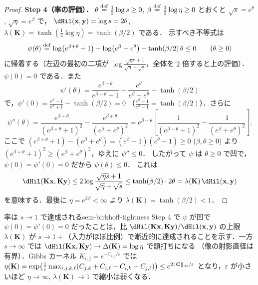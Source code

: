 \begin{proof}
  \textbf{Step 4（率の評価）．}
  $\theta \overset{\mathrm{def}}{=} \tfrac12\log s \geq 0$, $\beta \overset{\mathrm{def}}{=} \tfrac12\log\eta \geq 0$ とおくと
  $\sqrt{s} = e^\theta$, $\sqrt{\eta} = e^\beta$ で，
  $\dHil(\mathbf{x}, \mathbf{y}) = \log s = 2\theta$,
  $\lambda(\mathbf{K}) = \tanh(\tfrac14\log\eta) = \tanh(\beta/2)$ である．
  示すべき不等式は
  \[
    \psi(\theta) \overset{\mathrm{def}}{=}
    \log\bigl(e^{\beta+\theta} + 1\bigr) - \log\bigl(e^\beta + e^\theta\bigr)
    - \tanh(\beta/2)\,\theta \leq 0
    \qquad (\theta \geq 0)
  \]
  に帰着する（左辺の最初の二項が
  $\log\frac{\sqrt{\eta s}+1}{\sqrt\eta+\sqrt s}$，全体を $2$ 倍すると上の評価）．
  $\psi(0) = 0$ である．また
  \[
    \psi'(\theta)
    = \frac{e^{\beta+\theta}}{e^{\beta+\theta}+1}
    - \frac{e^\theta}{e^\beta + e^\theta}
    - \tanh(\beta/2)
  \]
  で，$\psi'(0) = \frac{e^\beta - 1}{e^\beta + 1} - \tanh(\beta/2) = 0$
  （$\frac{e^\beta-1}{e^\beta+1} = \tanh(\beta/2)$）．さらに
  \[
    \psi''(\theta)
    = \frac{e^{\beta+\theta}}{(e^{\beta+\theta}+1)^2}
    - \frac{e^{\beta+\theta}}{(e^\beta + e^\theta)^2}
    = e^{\beta+\theta}\left[\frac{1}{(e^{\beta+\theta}+1)^2} - \frac{1}{(e^\beta+e^\theta)^2}\right].
  \]
  ここで
  $(e^{\beta+\theta} + 1) - (e^\beta + e^\theta) = (e^\beta - 1)(e^\theta - 1) \geq 0$
  ($\beta, \theta \geq 0$) より $(e^{\beta+\theta}+1)^2 \geq (e^\beta + e^\theta)^2$，ゆえに $\psi'' \leq 0$．
  したがって $\psi$ は $\theta \geq 0$ で凹で，$\psi(0) = \psi'(0) = 0$ だから $\psi(\theta) \leq 0$．
  これは
  \[
    \dHil(\mathbf{K}\mathbf{x}, \mathbf{K}\mathbf{y})
    \leq 2\log\frac{\sqrt{\eta s}+1}{\sqrt\eta+\sqrt s}
    \leq \tanh(\beta/2)\cdot 2\theta
    = \lambda(\mathbf{K})\,\dHil(\mathbf{x}, \mathbf{y})
  \]
  を意味する．最後に $\eta = e^{2\beta} < \infty$ より $\lambda(\mathbf{K}) = \tanh(\beta/2) < 1$．
\end{proof}

\begin{remark}{率は $s\to1$ で達成される}{sem-birkhoff-tightness}
  Step 4 で $\psi$ が凹で $\psi(0)=\psi'(0)=0$ だったことは，比
  $\dHil(\mathbf{K}\mathbf{x},\mathbf{K}\mathbf{y})/\dHil(\mathbf{x},\mathbf{y})$ の上限 $\lambda(\mathbf{K})$ が
  $s \to 1+$（入力がほぼ比例）で漸近的に達成されることを示す．一方 $s \to \infty$ では
  $\dHil(\mathbf{K}\mathbf{x},\mathbf{K}\mathbf{y}) \to \Delta(\mathbf{K}) = \log\eta$ で頭打ちになる
  （像の射影直径は有界）．Gibbs カーネル $K_{i,j} = e^{-C_{i,j}/\varepsilon}$ では
  $\eta(\mathbf{K}) = \exp\bigl(\tfrac{1}{\varepsilon}\max_{i,j,k,\ell}(C_{j,k}+C_{i,\ell}-C_{i,k}-C_{j,\ell})\bigr)
  \leq e^{2\lVert \mathbf{C} \rVert_\infty/\varepsilon}$ となり，$\varepsilon$ が小さいほど
  $\eta \to \infty$, $\lambda(\mathbf{K}) \to 1$ で縮小は弱くなる．
\end{remark}

